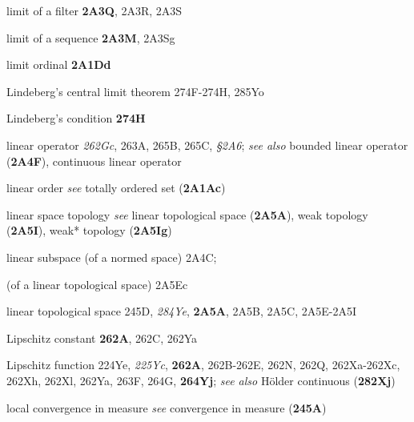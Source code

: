 















limit of a filter {\bf 2A3Q}, 2A3R, 2A3S


limit of a sequence {\bf 2A3M}, 2A3Sg




limit ordinal {\bf 2A1Dd}


Lindeberg's central limit theorem 274F-274H, 
285Yo


Lindeberg's condition {\bf 274H}












\ifdim\pagewidth>467pt\fi
linear operator {\it 262Gc}, 263A, 265B, 265C, {\it \S2A6};  
  {\it see also} bounded linear operator ({\bf 2A4F}),
continuous linear operator  

\tenrm=1.67pt

linear order {\it see} totally ordered set ({\bf 2A1Ac})




linear space topology {\it see} linear topological space ({\bf 2A5A}),
weak topology ({\bf 2A5I}),
weak* topology ({\bf 2A5Ig})


linear subspace (of a normed space) 2A4C;
  
  (of a linear topological space) 2A5Ec


linear topological space 245D, {\it 284Ye}, {\bf 2A5A}, 2A5B, 2A5C,
2A5E-2A5I









Lipschitz constant {\bf 262A}, 262C, 262Ya


Lipschitz function 224Ye, {\it 225Yc}, {\bf 262A},
262B-262E, 
262N, 262Q, 262Xa-262Xc, 
262Xh, 262Xl, 262Ya, 263F, 264G, {\bf 264Yj}; 
  {\it see also} H\"older continuous ({\bf 282Xj})




local convergence in measure {\it see} convergence in measure
({\bf 245A})








